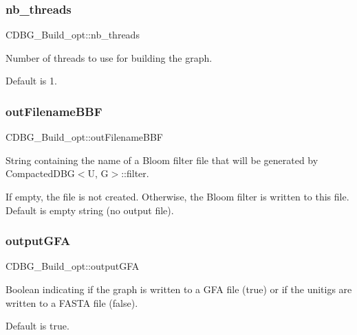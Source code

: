 \subsubsection{\texorpdfstring{nb\+\_\+threads}{nb\_threads}}
{\footnotesize\ttfamily C\+D\+B\+G\+\_\+\+Build\+\_\+opt\+::nb\+\_\+threads}



Number of threads to use for building the graph. 

Default is 1. \mbox{\label{structCDBG__Build__opt_aa10751be5fcf01b1686cce66ebab733e}} 
\subsubsection{\texorpdfstring{out\+Filename\+B\+BF}{outFilenameBBF}}
{\footnotesize\ttfamily C\+D\+B\+G\+\_\+\+Build\+\_\+opt\+::out\+Filename\+B\+BF}



String containing the name of a Bloom filter file that will be generated by Compacted\+D\+B\+G$<$\+U, G$>$\+::filter. 

If empty, the file is not created. Otherwise, the Bloom filter is written to this file. Default is empty string (no output file). \mbox{\label{structCDBG__Build__opt_a59256092145b2e12068a0874e3bffa94}} 
\subsubsection{\texorpdfstring{output\+G\+FA}{outputGFA}}
{\footnotesize\ttfamily C\+D\+B\+G\+\_\+\+Build\+\_\+opt\+::output\+G\+FA}



Boolean indicating if the graph is written to a G\+FA file (true) or if the unitigs are written to a F\+A\+S\+TA file (false). 

Default is true. \mbox{\label{structCDBG__Build__opt_a65f1dfdab74608283293c69e4bad60ba}} 
